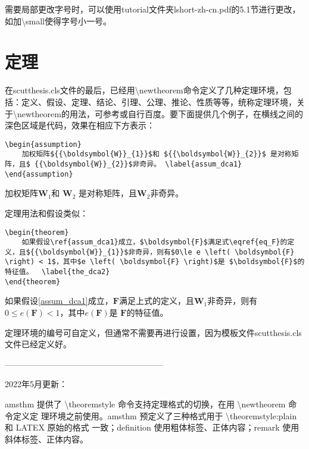 需要局部更改字号时，可以使用tutorial文件夹lshort-zh-cn.pdf的5.1节进行更改，如加\textbackslash{}small使得字号小一号。
\section{定理}
在scutthesis.cls文件的最后，已经用\textbackslash{}newtheorem命令定义了几种定理环境，包括：定义、假设、定理、结论、引理、公理、推论、性质等等，统称定理环境，关于\textbackslash{}newtheorem的用法，可参考或自行百度。要下面提供几个例子，在横线之间的深色区域是代码，效果在相应下方表示：
\begin{lstlisting}
\begin{assumption}
	加权矩阵${{\boldsymbol{W}}_{1}}$和 ${{\boldsymbol{W}}_{2}}$ 是对称矩阵，且$ {{\boldsymbol{W}}_{2}}$非奇异。	\label{assum_dca1}
\end{assumption}
\end{lstlisting}
\begin{assumption}
	加权矩阵${{\boldsymbol{W}}_{1}}$和 ${{\boldsymbol{W}}_{2}}$ 是对称矩阵，且$ {{\boldsymbol{W}}_{2}}$非奇异。	\label{assum_dca1}
\end{assumption}

定理用法和假设类似：
\begin{lstlisting}
\begin{theorem}
	如果假设\ref{assum_dca1}成立，$\boldsymbol{F}$满足式\eqref{eq_F}的定义，且${{\boldsymbol{W}}_{1}}$非奇异，则有$0\le e \left( \boldsymbol{F} \right) < 1$，其中$e \left( \boldsymbol{F} \right)$是 $\boldsymbol{F}$的特征值。	\label{the_dca2}
\end{theorem}
\end{lstlisting}
\begin{theorem}
	如果假设\ref{assum_dca1}成立，$\boldsymbol{F}$满足上式的定义，且${{\boldsymbol{W}}_{1}}$非奇异，则有$0\le e \left( \boldsymbol{F} \right) < 1$，其中$e \left( \boldsymbol{F} \right)$是 $\boldsymbol{F}$的特征值。	\label{the_dca2}
\end{theorem}
\begin{remark}
	定理环境的编号可自定义，但通常不需要再进行设置，因为模板文件scutthesis.cls文件已经定义好。
\end{remark}

---------------------------------------------------------

2022年5月更新：



amsthm 提供了 \textbackslash{}theoremstyle 命令支持定理格式的切换，在用 \textbackslash{}newtheorem 命令定义定 理环境之前使用。amsthm 预定义了三种格式用于 \textbackslash{}theoremstyle:plain 和 LATEX 原始的格式 一致；definition 使用粗体标签、正体内容；remark 使用斜体标签、正体内容。

